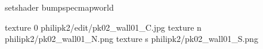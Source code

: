 setshader bumpspecmapworld

texture 0 philipk2/edit/pk02_wall01_C.jpg
texture n philipk2/pk02_wall01_N.png
texture s philipk2/pk02_wall01_S.png

